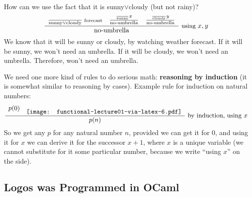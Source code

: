 \documentclass{beamer}
\newcommand{\tmstrong}[1]{\textbf{#1}}
\begin{document}
{{\begin{frame}
  How can we use the fact that it is sunny$\vee$cloudy (but not rainy)?
  \[ \frac{\begin{array}{rrl}
       \frac{}{\text{sunny} \vee \text{cloudy}} \scriptsize{\text{ forecast}}
       & \frac{\frac{}{\text{sunny}} \scriptsize{x}}{\text{no-umbrella}} &
       \frac{\frac{}{\text{cloudy}} \scriptsize{y}}{\text{no-umbrella}}
     \end{array}}{\text{no-umbrella}} \small{\text{ using } x, y} \]
  We know that it will be sunny or cloudy, by watching weather forecast. If it
  will be sunny, we won't need an umbrella. If it will be cloudy, we won't
  need an umbrella. Therefore, won't need an umbrella.
\end{frame}}{\begin{frame}
  We need one more kind of rules to do serious math: {\tmstrong{reasoning by
  induction}} (it is somewhat similar to reasoning by cases). Example rule for
  induction on natural numbers:
  \[ \frac{\begin{array}{rr}
       p (0) &
       \raisebox{-0.788180506203233\height}{\texttt{[image: functional-lecture01-via-latex-6.pdf]}}
     \end{array}}{p (n)} \text{ by induction, using } x \]
  So we get any $p$ for any natural number $n$, provided we can get it for
  $0$, and using it for $x$ we can derive it for the successor $x + 1$, where
  $x$ is a unique variable (we cannot substitute for it some particular
  number, because we write ``using $x$'' on the side).
\end{frame}}{\begin{frame}
  \section{Logos was Programmed in OCaml}
  

\end{frame}}}
\end{document}
